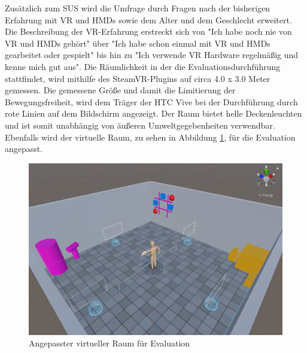 \noindent Zusätzlich zum SUS wird die Umfrage durch Fragen nach der bisherigen Erfahrung mit VR und HMDs sowie dem Alter und dem Geschlecht erweitert. Die Beschreibung der VR-Erfahrung erstreckt sich von "Ich habe noch nie von VR und HMDs gehört" über "Ich habe schon einmal mit VR und HMDs gearbeitet oder gespielt" bis hin zu "Ich verwende VR Hardware regelmäßig und kenne mich gut aus". Die Räumlichkeit in der die Evaluationsdurchführung stattfindet, wird mithilfe des SteamVR-Plugins auf circa 4.0 x 3.0 Meter gemessen. Die gemessene Größe und damit die Limitierung der Bewegungsfreiheit, wird dem Träger der HTC Vive bei der Durchführung durch rote Linien auf dem Bildschirm angezeigt. Der Raum bietet helle Deckenleuchten und ist somit unabhängig von äußeren Umweltgegebenheiten verwendbar. Ebenfalls wird der virtuelle Raum, zu sehen in Abbildung \ref{fig:evaraum}, für die Evaluation angepasst.

\begin{figure}[h]
\captionsetup{width=.7\linewidth}
\includegraphics[scale=0.5]{Bilder/Hauptteil/BildRaum}
\centering
\caption{Angepasster virtueller Raum für Evaluation}
\label{fig:evaraum}
\end{figure}

